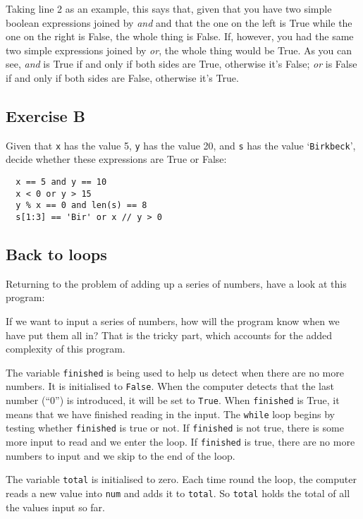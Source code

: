 Taking line 2 as an example, this says that, given that you have two simple
boolean expressions joined by \emph{and} and that the one on the left is
True while the one on the right is False, the whole thing is False.  If,
however, you had the same two simple expressions joined by \emph{or}, the
whole thing would be True. As you can see, \emph{and} is True if and
only if both sides are True, otherwise it's False; \emph{or} is False
if and only if both sides are False, otherwise it's True.

\subsection*{Exercise B}

Given that \texttt{x} has the value 5, \texttt{y} has the value 20,
and \texttt{s} has the value `\texttt{Birkbeck}', decide whether these
expressions are True or False:

\begin{verbatim}
  x == 5 and y == 10
  x < 0 or y > 15
  y % x == 0 and len(s) == 8
  s[1:3] == 'Bir' or x // y > 0
\end{verbatim}

\subsection{Back to loops}

Returning to the problem of adding up a series of numbers, have a
look at this program:


If we want to input a series of numbers, how will the program know
when we have put them all in?  That is the tricky part, which accounts
for the added complexity of this program.

The variable
\texttt{finished} is being used to help us detect when there are no more
numbers. It is initialised to \texttt{False}.  When the computer detects
that the last number (``0'') is introduced, it will be set to \texttt{True}.
When \texttt{finished} is True, it means that we have finished reading in
the input. The \texttt{while} loop begins by testing whether \texttt{finished}
is true or not.  If \texttt{finished} is not true, there is some more input
to read and we enter the loop. If \texttt{finished} is true, there are
no more numbers to input and we skip to the end of the loop.

The variable \texttt{total} is initialised to zero.
Each time round the loop, the computer reads a new value into \texttt{num}
and adds it to \texttt{total}. So \texttt{total} holds the total of all
the values input so far.


